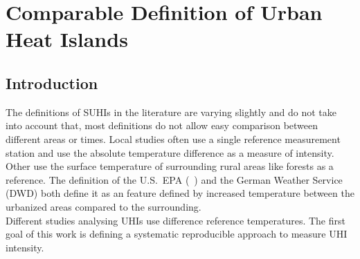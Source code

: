 \documentclass[12pt,a4paper, english,twoside]{article}
\begin{document}
    
\newpage
\section{Comparable Definition of Urban Heat Islands}\label{sec:definition}
    \subsection{Introduction}
      The definitions of \glspl{SUHI} in the literature are varying slightly and do not take into account that, most definitions do not allow easy comparison between different areas or times.
      Local studies often use a single reference measurement station and use the absolute temperature difference as a measure of intensity.
      Other use the surface temperature of surrounding rural areas like forests as a reference.
      The definition of the U.S.~EPA (~\cite{EPA2008}) and the German Weather Service (\gls{DWD}) both define it as an feature defined by increased temperature between the urbanized areas compared to the surrounding.\\ 
      Different studies analysing \glspl{UHI} use difference reference temperatures.
      The first goal of this work is defining a systematic reproducible approach to measure \gls{UHI} intensity.
\end{document}
